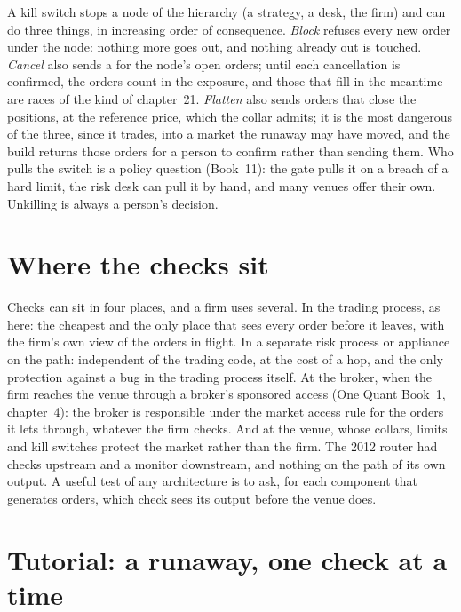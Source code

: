 A kill switch stops a node of the hierarchy (a strategy, a desk, the firm) and can do three things, in increasing order of
consequence. \emph{Block} refuses every new order under the node: nothing more goes out, and nothing already out is touched.
\emph{Cancel} also sends a  for the node's open orders; until each cancellation is confirmed, the orders count in
the exposure, and those that fill in the meantime are races of the kind of chapter~21. \emph{Flatten} also sends orders that
close the positions, at the reference price, which the collar admits; it is the most dangerous of the three, since it trades,
into a market the runaway may have moved, and the build returns those orders for a person to confirm rather than sending them.
Who pulls the switch is a policy question (Book~11): the gate pulls it on a breach of a hard limit, the risk desk can pull it
by hand, and many venues offer their own. Unkilling is always a person's decision.

\label{lst:ll:pre-trade-risk-and-kill-switches:kill}

\section{Where the checks sit}

Checks can sit in four places, and a firm uses several. In the trading process, as here: the cheapest and the only place
that sees every order before it leaves, with the firm's own view of the orders in flight. In a separate risk process or
appliance on the path: independent of the trading code, at the cost of a hop, and the only protection against a bug in
the trading process itself. At the broker, when the firm reaches the venue through a broker's sponsored access (One Quant
Book~1, chapter~4): the broker is responsible under the market access rule for the orders it lets through, whatever the
firm checks. And at the venue, whose collars, limits and kill switches protect the market rather than the firm. The 2012 router
had checks upstream and a monitor downstream, and nothing on the path of its own output. A useful test of any architecture is to
ask, for each component that generates orders, which check sees its output before the venue does.

\section{Tutorial: a runaway, one check at a time}\label{tut:ll:pre-trade-risk-and-kill-switches:tut}

